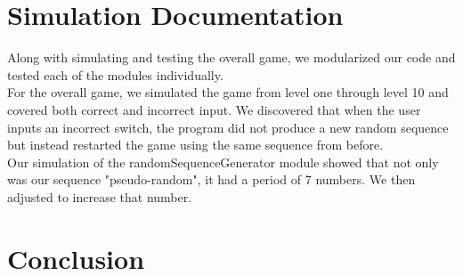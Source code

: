 \documentclass[]{article}
\begin{document}
\section{Simulation Documentation}

Along with simulating and testing the overall game, we modularized our code and tested each of the modules individually. \\

For the overall game, we simulated the game from level one through level 10 and covered both correct and incorrect input. We discovered that when the user inputs an incorrect switch, the program did not produce a new random sequence but instead restarted the game using the same sequence from before. \\

Our simulation of the randomSequenceGenerator module showed that not only was our sequence "pseudo-random", it had a period of 7 numbers. We then adjusted to increase that number.

\section{Conclusion}
\end{document}
